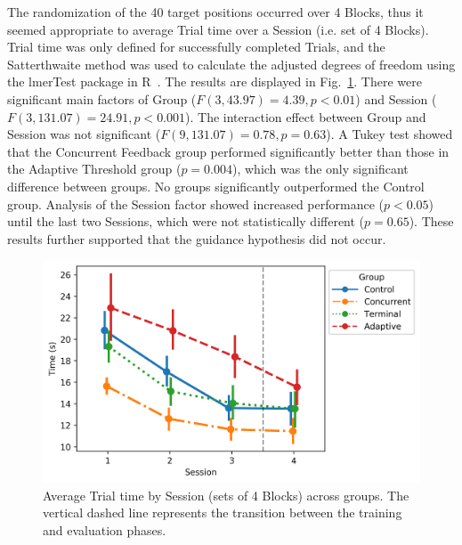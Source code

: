 The randomization of the 40 target positions occurred over 4 Blocks, thus it seemed appropriate to average Trial time over a Session (i.e. set of 4 Blocks).
Trial time was only defined for successfully completed Trials, and the Satterthwaite method was used to calculate the adjusted degrees of freedom using the lmerTest package in R~\cite{RN53}.
The results are displayed in Fig.~\ref{figure:label4}.
There were significant main factors of Group ($F(3, 43.97) = 4.39, p < 0.01$) and Session ($F(3, 131.07) = 24.91, p < 0.001$).
The interaction effect between Group and Session was not significant ($F(9, 131.07) = 0.78, p = 0.63$).
A Tukey test showed that the Concurrent Feedback group performed significantly better than those in the Adaptive Threshold group ($p = 0.004$), which was the only significant difference between groups.
No groups significantly outperformed the Control group.
Analysis of the Session factor showed increased performance ($p < 0.05$) until the last two Sessions, which were not statistically different ($p = 0.65$).
These results further supported that the guidance hypothesis did not occur.

\begin{figure}[hbt!]
\centering
\includegraphics[height=.4\textwidth]{figures/TrialTime_session}
\caption{\label{figure:label4} Average Trial time by Session (sets of 4 Blocks) across groups.
The vertical dashed line represents the transition between the training and evaluation phases.}
\end{figure}

